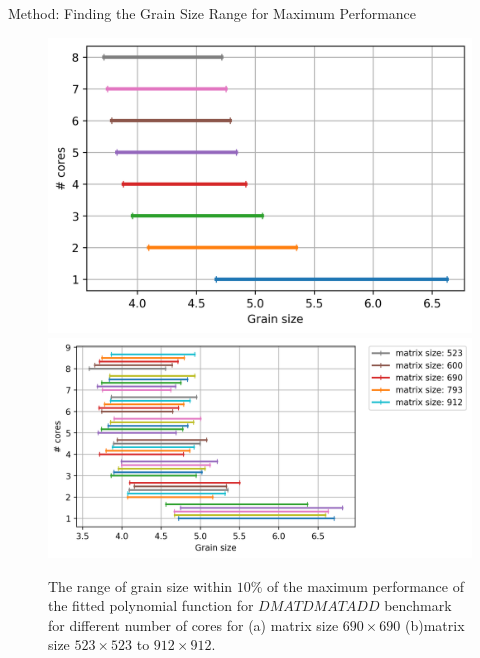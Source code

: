 \documentclass[10pt]{beamer}
\begin{document}
\begin{frame}{Method: Finding the Grain Size Range for Maximum Performance}
	\begin{outline}
		\begin{figure}[H]
			\centering
			{\includegraphics[scale=.3]{images/polyfit/fig_690_peak_range_all.png}\label{fig13:a}}
			{\includegraphics[scale=.3]{images/polyfit/fig_523-912_peak_range_all.png}\label{fig13:b}}
			\caption{The range of grain size within $10\%$ of the maximum performance of the fitted polynomial function for $DMATDMATADD$ benchmark for different number of cores for (a) matrix size $690\times690$ (b)matrix size $523\times523$ to $912\times912$.}	
			\label{fig13}
\end{figure}
\end{outline}
\end{frame}
\end{document}
